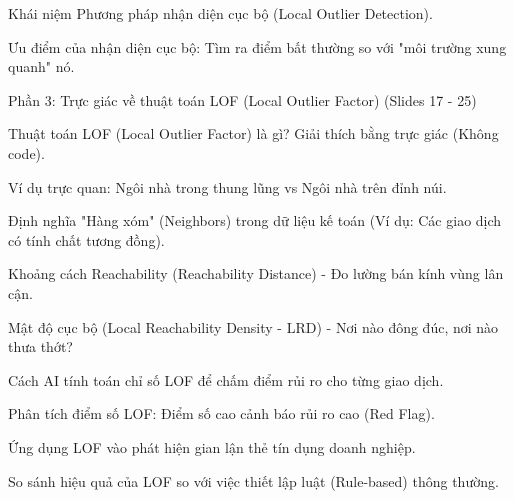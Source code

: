 \documentclass[aspectratio=169]{beamer}
\begin{document}
\begin{frame}{Khái niệm Phương pháp nhận diện cục bộ (Local Outlier Detection).}
\end{frame}


\begin{frame}{Ưu điểm của nhận diện cục bộ: Tìm ra điểm bất thường so với "môi trường xung quanh" nó.}
\end{frame}


\begin{frame}{Phần 3: Trực giác về thuật toán LOF (Local Outlier Factor) (Slides 17 - 25)}
\end{frame}


\begin{frame}{Thuật toán LOF (Local Outlier Factor) là gì? Giải thích bằng trực giác (Không code).}
\end{frame}


\begin{frame}{Ví dụ trực quan: Ngôi nhà trong thung lũng vs Ngôi nhà trên đỉnh núi.}
\end{frame}


\begin{frame}{Định nghĩa "Hàng xóm" (Neighbors) trong dữ liệu kế toán (Ví dụ: Các giao dịch có tính chất tương đồng).}
\end{frame}


\begin{frame}{Khoảng cách Reachability (Reachability Distance) - Đo lường bán kính vùng lân cận.}
\end{frame}


\begin{frame}{Mật độ cục bộ (Local Reachability Density - LRD) - Nơi nào đông đúc, nơi nào thưa thớt?}
\end{frame}


\begin{frame}{Cách AI tính toán chỉ số LOF để chấm điểm rủi ro cho từng giao dịch.}
\end{frame}


\begin{frame}{Phân tích điểm số LOF: Điểm số cao cảnh báo rủi ro cao (Red Flag).}
\end{frame}


\begin{frame}{Ứng dụng LOF vào phát hiện gian lận thẻ tín dụng doanh nghiệp.}
\end{frame}


\begin{frame}{So sánh hiệu quả của LOF so với việc thiết lập luật (Rule-based) thông thường.}
\end{frame}
\end{document}
